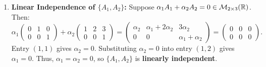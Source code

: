 \begin{exercisesolution}
\label{sol:matrix_span_and_independence}
\begin{enumerate}[label=\textbf{(\alph*)}]
    \item \textbf{Linear Independence of $\{A_1, A_2\}$:}
    Suppose $\alpha_1 A_1 + \alpha_2 A_2 = 0 \in \mathcal{M}_{2 \times 3}(\mathbb{R})$. Then:
    \[
    \alpha_1 \begin{pmatrix} 0 & 1 & 0 \\ 0 & 0 & 1 \end{pmatrix} + \alpha_2 \begin{pmatrix} 1 & 2 & 3 \\ 0 & 0 & 1 \end{pmatrix}
    = \begin{pmatrix} \alpha_2 & \alpha_1 + 2\alpha_2 & 3\alpha_2 \\ 0 & 0 & \alpha_1 + \alpha_2 \end{pmatrix}
    = \begin{pmatrix} 0 & 0 & 0 \\ 0 & 0 & 0 \end{pmatrix}.
    \]
    Entry $(1, 1)$ gives $\alpha_2 = 0$. Substituting $\alpha_2 = 0$ into entry $(1, 2)$ gives $\alpha_1 = 0$. Thus, $\alpha_1 = \alpha_2 = 0$, so $\{A_1, A_2\}$ is \textbf{linearly independent}.


\end{enumerate}
\end{exercisesolution}
